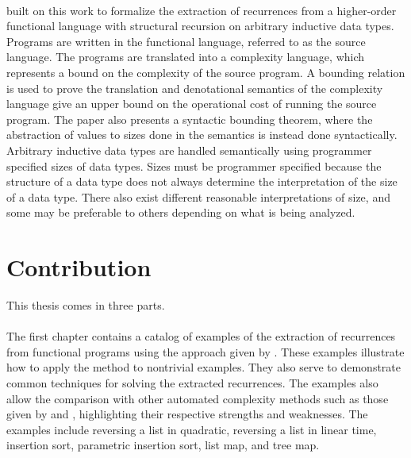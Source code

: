 \paragraph{}
\citet{Danner2015} built on this work to formalize the extraction
of recurrences from a higher-order functional language with structural
recursion on arbitrary inductive data types. Programs are written in the
functional language, referred to as the source language. The programs are
translated into a complexity language, which represents a bound on the
complexity of the source program. A bounding relation is used to prove the
translation and denotational semantics of the complexity language give an upper
bound on the operational cost of running the source program. The paper also
presents a syntactic bounding theorem, where the abstraction of values to sizes
done in the semantics is instead done syntactically. Arbitrary inductive data
types are handled semantically using programmer specified sizes of data types.
Sizes must be programmer specified because the structure of a data type does
not always determine the interpretation of the size of a data type. There also
exist different reasonable interpretations of size, and some may be
preferable to others depending on what is being analyzed.


\section{Contribution}

This thesis comes in three parts.
\paragraph{}
The first chapter contains a catalog of examples of the extraction of recurrences
from functional programs using the approach given by \citet{Danner2015}. These
examples illustrate how to apply the method to nontrivial examples. They also
serve to demonstrate common techniques for solving the extracted recurrences.
The examples also allow the comparison with other automated complexity methods
such as those given by \citet{Avanzini2015} and \citet{HoffHof2010},
highlighting their respective strengths and weaknesses. The examples include
reversing a list in quadratic, reversing a list in linear time, insertion sort,
parametric insertion sort, list map, and tree map.



